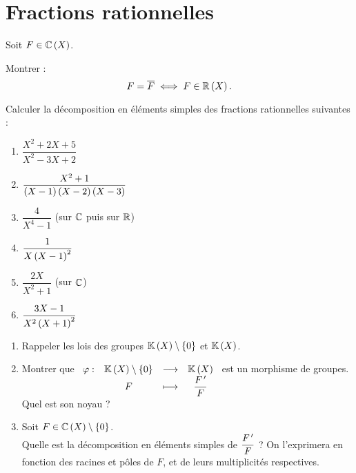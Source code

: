 \section{Fractions rationnelles}

\begin{exo}
Soit \(F\in\fracrat[\C]\).

Montrer : \[F=\conj{F}\ssi F\in\fracrat[\R].\]
\end{exo}

\begin{corr}
\end{corr}

\begin{exo}
Calculer la décomposition en éléments simples des fractions rationnelles suivantes :

\begin{enumerate}
\item \(\dfrac{X^2+2X+5}{X^2-3X+2}\) \\

\item \(\dfrac{X^2+1}{\left(X-1\right)\left(X-2\right)\left(X-3\right)}\) \\

\item \(\dfrac{4}{X^4-1}\) (sur \(\mathbb{C}\) puis sur \(\mathbb{R}\)) \\

\item \(\dfrac{1}{X\left(X-1\right)^2}\) \\

\item \(\dfrac{2X}{X^2+1}\) (sur \(\mathbb{C}\)) \\

\item \(\dfrac{3X-1}{X^2\left(X+1\right)^2}\)
\end{enumerate}
\end{exo}

\begin{corr}
\end{corr}

\begin{exo}
\begin{enumerate}
\item Rappeler les lois des groupes \(\fracrat\excluant\accol{0}\) et \(\fracrat\). \\

\item Montrer que \(\fonction{\phi}{\fracrat\excluant\accol{0}}{\fracrat}{F}{\dfrac{F\prim}{F}}\) est un morphisme de groupes. \\

Quel est son noyau ? \\

\item Soit \(F\in\fracrat[\C]\excluant\accol{0}\). \\

Quelle est la décomposition en éléments simples de \(\dfrac{F^{\,\prime}}{F}\) ? On l'exprimera en fonction des racines et pôles de \(F\), et de leurs multiplicités respectives.
\end{enumerate}
\end{exo}


